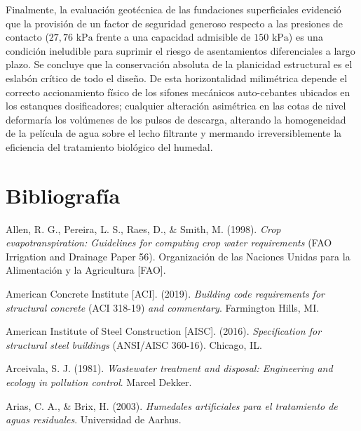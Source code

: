 \documentclass[12pt, letterpaper]{report}
\begin{document}
Finalmente, la evaluación geotécnica de las fundaciones superficiales evidenció que la provisión de un factor de seguridad generoso respecto a las presiones de contacto ($27,76\text{ kPa}$ frente a una capacidad admisible de $150\text{ kPa}$) es una condición ineludible para suprimir el riesgo de asentamientos diferenciales a largo plazo. Se concluye que la conservación absoluta de la planicidad estructural es el eslabón crítico de todo el diseño. De esta horizontalidad milimétrica depende el correcto accionamiento físico de los sifones mecánicos auto-cebantes ubicados en los estanques dosificadores; cualquier alteración asimétrica en las cotas de nivel deformaría los volúmenes de los pulsos de descarga, alterando la homogeneidad de la película de agua sobre el lecho filtrante y mermando irreversiblemente la eficiencia del tratamiento biológico del humedal.

\newpage

\chapter*{Bibliografía}

\begingroup
\setlength{\parindent}{0pt}
\setlength{\hangindent}{1.27cm}
\setlength{\parskip}{0.8em}

Allen, R. G., Pereira, L. S., Raes, D., \& Smith, M. (1998). \textit{Crop evapotranspiration: Guidelines for computing crop water requirements} (FAO Irrigation and Drainage Paper 56). Organización de las Naciones Unidas para la Alimentación y la Agricultura [FAO].

American Concrete Institute [ACI]. (2019). \textit{Building code requirements for structural concrete} (ACI 318-19) \textit{and commentary}. Farmington Hills, MI.

American Institute of Steel Construction [AISC]. (2016). \textit{Specification for structural steel buildings} (ANSI/AISC 360-16). Chicago, IL.

Arceivala, S. J. (1981). \textit{Wastewater treatment and disposal: Engineering and ecology in pollution control}. Marcel Dekker.

Arias, C. A., \& Brix, H. (2003). \textit{Humedales artificiales para el tratamiento de aguas residuales}. Universidad de Aarhus.
\end{document}
